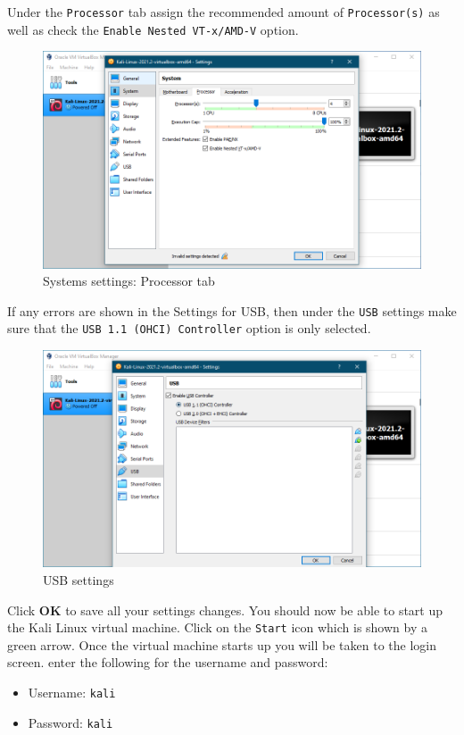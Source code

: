 \documentclass[a4paper, 12pt, titlepage]{report}
\begin{document}
Under the \texttt{Processor} tab assign the recommended amount of \texttt{Processor(s)} as well as check the \texttt{Enable Nested VT-x/AMD-V} option.
\begin{figure}[H]
    \centering
    \includegraphics[scale=0.5]{pics/settings2.PNG}
    \caption{Systems settings: Processor tab}
\end{figure}
If any errors are shown in the Settings for USB, then under the \texttt{USB} settings make sure that the \texttt{USB 1.1 (OHCI) Controller} option is only selected.
\begin{figure}[H]
    \centering
    \includegraphics[scale=0.5]{pics/settings3.PNG}
    \caption{USB settings}
\end{figure}
Click \textbf{OK} to save all your settings changes. You should now be able to start up the Kali Linux virtual machine. Click on the \texttt{Start} icon which is shown by a green arrow. Once the virtual machine starts up you will be taken to the login screen. enter the following for the username and password:
\begin{itemize}
    \item Username: \texttt{kali}
    \item Password: \texttt{kali}
\end{itemize}
\end{document}
